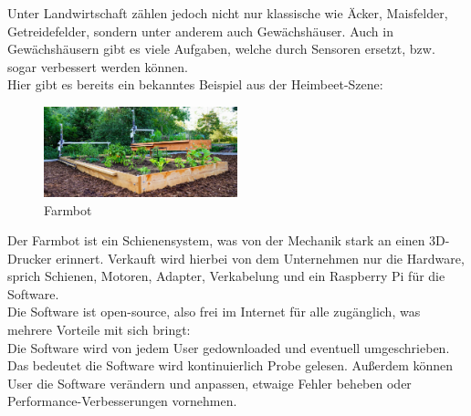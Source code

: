 Unter Landwirtschaft zählen jedoch nicht nur klassische wie Äcker, Maisfelder, Getreidefelder, sondern unter anderem auch Gewächshäuser. Auch in Gewächshäusern gibt es viele Aufgaben, welche durch Sensoren ersetzt, bzw. sogar verbessert werden können.\\
Hier gibt es bereits ein bekanntes Beispiel aus der Heimbeet-Szene:\\

\begin{figure}[h]
	\centering
	\includegraphics[width=0.5\textwidth]{bilder/farmbot.png}
	\caption[Farmbot]{Farmbot}
	\label{fig:farmbot}
\end{figure}

Der Farmbot ist ein Schienensystem, was von der Mechanik stark an einen 3D-Drucker erinnert. Verkauft wird hierbei von dem Unternehmen nur die Hardware, sprich Schienen, Motoren, Adapter, Verkabelung und ein Raspberry Pi für die Software.\\
Die Software ist open-source, also frei im Internet für alle zugänglich, was mehrere Vorteile mit sich bringt:\\
Die Software wird von jedem User gedownloaded und eventuell umgeschrieben. Das bedeutet die Software wird kontinuierlich Probe gelesen. Außerdem können User die Software verändern und anpassen, etwaige Fehler beheben oder Performance-Verbesserungen vornehmen.